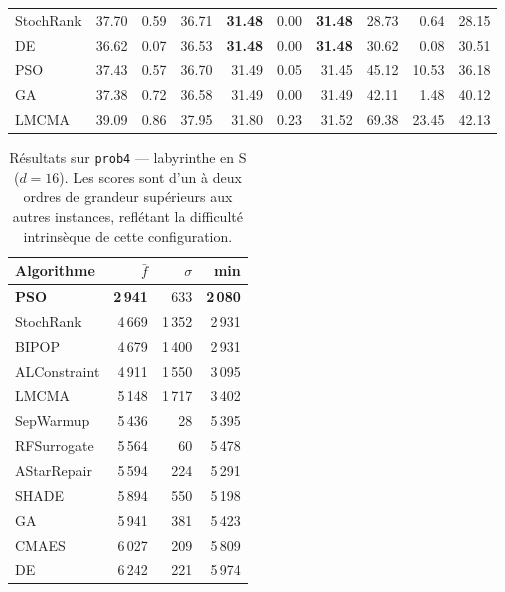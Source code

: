 \begin{table}[H]
{\begin{tabular}{@{}l rrr rrr rrr@{}}
StochRank             & 37.70 & 0.59 & 36.71
                      & \textbf{31.48} & 0.00 & \textbf{31.48}
                      & 28.73 & 0.64 & 28.15 \\
DE                    & 36.62 & 0.07 & 36.53
                      & \textbf{31.48} & 0.00 & \textbf{31.48}
                      & 30.62 & 0.08 & 30.51 \\
PSO                   & 37.43 & 0.57 & 36.70
                      & 31.49 & 0.05 & 31.45
                      & 45.12 & 10.53 & 36.18 \\
GA                    & 37.38 & 0.72 & 36.58
                      & 31.49 & 0.00 & 31.49
                      & 42.11 & 1.48 & 40.12 \\
LMCMA                 & 39.09 & 0.86 & 37.95
                      & 31.80 & 0.23 & 31.52
                      & 69.38 & 23.45 & 42.13 \\
\bottomrule
\end{tabular}%
}
\end{table}

\begin{table}[H]
\centering
\caption{Résultats sur \texttt{prob4} — labyrinthe en S ($d=16$).  Les scores
sont d'un à deux ordres de grandeur supérieurs aux autres instances, reflétant
la difficulté intrinsèque de cette configuration.}
\label{tab:results_prob4}
\begin{tabular}{@{}lrrr@{}}
\toprule
Algorithme & $\bar{f}$ & $\sigma$ & min \\
\midrule
\textbf{PSO}          & \textbf{2\,941} & 633   & \textbf{2\,080} \\
StochRank             & 4\,669          & 1\,352 & 2\,931 \\
BIPOP                 & 4\,679          & 1\,400 & 2\,931 \\
ALConstraint          & 4\,911          & 1\,550 & 3\,095 \\
LMCMA                 & 5\,148          & 1\,717 & 3\,402 \\
SepWarmup             & 5\,436          & 28    & 5\,395 \\
RFSurrogate           & 5\,564          & 60    & 5\,478 \\
AStarRepair           & 5\,594          & 224   & 5\,291 \\
SHADE                 & 5\,894          & 550   & 5\,198 \\
GA                    & 5\,941          & 381   & 5\,423 \\
CMAES                 & 6\,027          & 209   & 5\,809 \\
DE                    & 6\,242          & 221   & 5\,974 \\
\bottomrule
\end{tabular}
\end{table}

